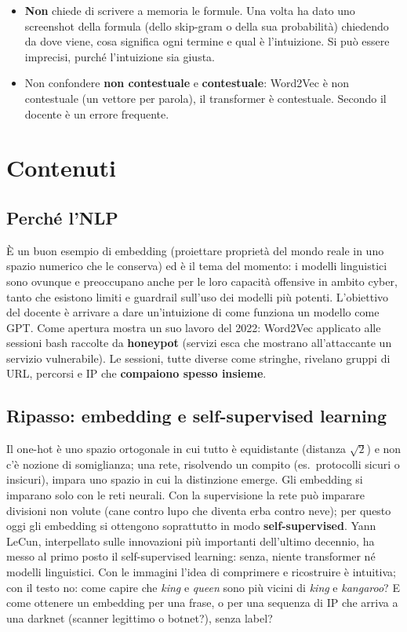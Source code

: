 \begin{esame}
\begin{itemize}
  \item \textbf{Non} chiede di scrivere a memoria le formule. Una volta ha dato uno screenshot della formula
        (dello skip-gram o della sua probabilità) chiedendo da dove viene, cosa significa ogni termine e qual è
        l'intuizione. Si può essere imprecisi, purché l'intuizione sia giusta.
  \item Non confondere \textbf{non contestuale} e \textbf{contestuale}: Word2Vec è non contestuale (un vettore
        per parola), il transformer è contestuale. Secondo il docente è un errore frequente.
\end{itemize}
\end{esame}

\section{Contenuti}

\subsection{Perché l'NLP}
È un buon esempio di embedding (proiettare proprietà del mondo reale in uno spazio numerico che le conserva)
ed è il tema del momento: i modelli linguistici sono ovunque e preoccupano anche per le loro capacità
offensive in ambito cyber, tanto che esistono limiti e guardrail sull'uso dei modelli più potenti. L'obiettivo
del docente è arrivare a dare un'intuizione di come funziona un modello come GPT. Come apertura mostra un suo
lavoro del 2022: Word2Vec applicato alle sessioni bash raccolte da \textbf{honeypot} (servizi esca che
mostrano all'attaccante un servizio vulnerabile). Le sessioni, tutte diverse come stringhe, rivelano gruppi
di URL, percorsi e IP che \textbf{compaiono spesso insieme}.

\subsection{Ripasso: embedding e self-supervised learning}
Il one-hot è uno spazio ortogonale in cui tutto è equidistante (distanza $\sqrt{2}$) e non c'è nozione di
somiglianza; una rete, risolvendo un compito (es.\ protocolli sicuri o insicuri), impara uno spazio in cui la
distinzione emerge. Gli embedding si imparano solo con le reti neurali. Con la supervisione la rete può
imparare divisioni non volute (cane contro lupo che diventa erba contro neve); per questo oggi gli embedding
si ottengono soprattutto in modo \textbf{self-supervised}. Yann LeCun, interpellato sulle innovazioni più
importanti dell'ultimo decennio, ha messo al primo posto il self-supervised learning: senza, niente
transformer né modelli linguistici. Con le immagini l'idea di comprimere e ricostruire è intuitiva; con il
testo no: come capire che \emph{king} e \emph{queen} sono più vicini di \emph{king} e \emph{kangaroo}? E come
ottenere un embedding per una frase, o per una sequenza di IP che arriva a una darknet (scanner legittimo o
botnet?), senza label?

